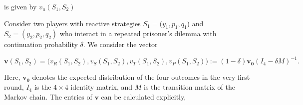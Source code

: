\documentclass[11pt]{article}
\theoremstyle{plainCl1}
\newtheorem{Prop}{Proposition}
\theoremstyle{plainCl2}
\begin{document}

is given by $v_{u}(S_1,S_2)$

Consider two players with reactive strategies $S_1\!=\!(y_1, p_1, q_1$) and $S_2\!=\!(y_2,p_2,q_2)$ who interact in a repeated prisoner's dilemma with continuation probability $\delta$. We consider the vector 

\begin{equation}
\mathbf{v}(S_1,S_2)\!=\!\Big(v_{R}(S_1,S_2),v_{S}(S_1,S_2),v_{T}(S_1,S_2),v_{P}(S_1,S_2)\Big)\!:=\!(1\!-\!\delta)\mathbf{v_0}(I_4-\delta M)^{-1}.
\end{equation}

Here, $\mathbf{v_0}$ denotes the expected distribution of the four outcomes in the very first round, $I_4$ is the $4\!\times\!4$ identity matrix, and $M$ is the transition matrix of the Markov chain. 
The entries of $\mathbf{v}$ can be calculated explicitly,
\end{document}
